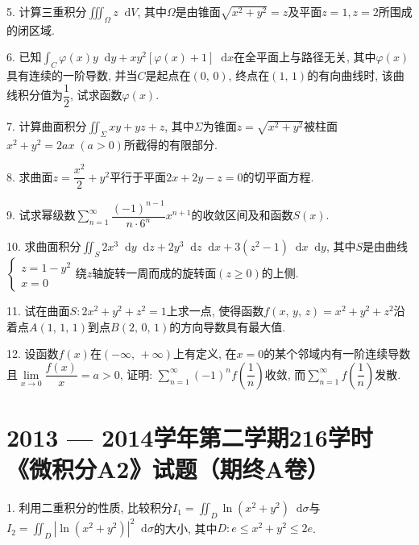 \documentclass{article}
\newcommand*{\dif}{\mathop{}\!\mathrm{d}}
\begin{document}
5. 计算三重积分$\displaystyle\iiint_\Omega{z \dif V}$, 其中$\Omega$是由锥面$\sqrt{x^2+y^2}=z$及平面$z=1, z=2$所围成的闭区域. \par

6. 已知$\displaystyle\int_C{\varphi(x) y \dif y + x y^2[\varphi(x)+1] \dif x}$在全平面上与路径无关, 其中$\varphi(x)$具有连续的一阶导数, 并当$C$是起点在$(0,\,0)$, 终点在$(1,\,1)$的有向曲线时, 该曲线积分值为$\dfrac{1}{2}$, 试求函数$\varphi(x)$. \par

7. 计算曲面积分$\displaystyle\iint_\Sigma{x y + y z + z}$, 其中$\Sigma$为锥面$z=\sqrt{x^2+y^2}$被柱面$x^2+y^2 = 2a x \; (a>0)$所截得的有限部分. \par

8. 求曲面$z=\dfrac{x^2}{2}+y^2$平行于平面$2x+2y-z=0$的切平面方程.\par

9. 试求幂级数$\displaystyle\sum\limits_{n=1}^\infty{\dfrac{(-1)^{n-1}}{n\cdot 6^n}x^{n+1}}$的收敛区间及和函数$S(x)$.\par

10. 求曲面积分$\displaystyle\iint_S{2 x^3 \dif y \dif z + 2 y^3 \dif z \dif x + 3(z^2-1) \dif x \dif y}$, 其中$S$是由曲线$\begin{cases}z=1-y^2\\ x=0\end{cases}$绕$z$轴旋转一周而成的旋转面$(z\geqslant0)$的上侧.\par

11. 试在曲面$S: 2 x^2 + y^2 + z^2 = 1$上求一点, 使得函数$f(x,\,y,\,z)=x^2+y^2+z^2$沿着点$A(1,\,1,\,1)$到点$B(2,\,0,\,1)$的方向导数具有最大值.\par

12. 设函数$f(x)$在$(-\infty,\,+\infty)$上有定义, 在$x=0$的某个邻域内有一阶连续导数且$\lim\limits_{x \to 0}{\dfrac{f(x)}{x}} = a > 0$, 证明: $\displaystyle\sum\limits_{n=1}^\infty{(-1)^n f\left(\dfrac{1}{n}\right)}$收敛, 而$\displaystyle\sum\limits_{n=1}^\infty{f\left(\dfrac{1}{n}\right)}$发散.

\newpage

\section*{2013 --- 2014学年第二学期216学时《微积分A2》试题（期终A卷）}
1. 利用二重积分的性质, 比较积分$I_1 = \displaystyle\iint_D{\ln(x^2+y^2) \dif \sigma}$与$I_2 = \displaystyle\iint_D|\ln(x^2+y^2)|^2 \dif \sigma$的大小, 其中$D: e\leqslant x^2+y^2\leqslant2e$.\par
\end{document}
